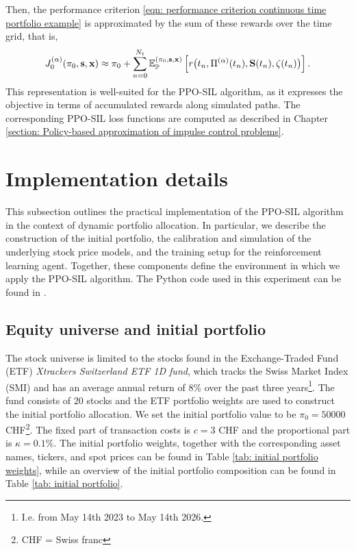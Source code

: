 Then, the performance criterion \eqref{eqn: performance criterion continuous time portfolio example} is approximated by the sum of these rewards over the time grid, that is, 
\begin{equation*}
    J^{(\alpha)}_0(\pi_0, \mathbf s, \mathbf x) \approx \pi_0 + \sum_{n=0}^{N_t}\mathbb{E}_{\mathbb{P}}^{(\pi_0, \mathbf s, \mathbf x)}\left[ r\big(t_n,\Pi^{(\alpha)}(t_n), \mathbf{S}(t_{n}), \zeta(t_n) \big) \right].
\end{equation*}
This representation is well-suited for the PPO-SIL algorithm, as it expresses the objective in terms of accumulated rewards along simulated paths. The corresponding PPO-SIL loss functions are computed as described in Chapter \ref{section: Policy-based approximation of impulse control problems}.

\section{Implementation details}
This subsection outlines the practical implementation of the PPO-SIL algorithm in the context of dynamic portfolio allocation. In particular, we describe the construction of the initial portfolio, the calibration and simulation of the underlying stock price models, and the training setup for the reinforcement learning agent. Together, these components define the environment in which we apply the PPO-SIL algorithm. The Python code used in this experiment can be found in \cite{mycode}.

\subsection{Equity universe and initial portfolio}
The stock universe is limited to the stocks found in the Exchange-Traded Fund (ETF) \textit{Xtrackers Switzerland ETF 1D fund}, which tracks the Swiss Market Index (SMI) and has an average annual return of 8\% over the past three years\footnote{I.e. from May 14th 2023 to May 14th 2026.}. The fund consists of 20 stocks and the ETF portfolio weights are used to construct the initial portfolio allocation. We set the initial portfolio value to be $\pi_0=50000$ CHF\footnote{CHF = Swiss franc}. The fixed part of transaction costs is $c=3$ CHF and the proportional part is $\kappa=0.1\%$. The initial portfolio weights, together with the corresponding asset names, tickers, and spot prices can be found in Table \ref{tab: initial portfolio weights}, while an overview of the initial portfolio composition can be found in Table \ref{tab: initial portfolio}.

